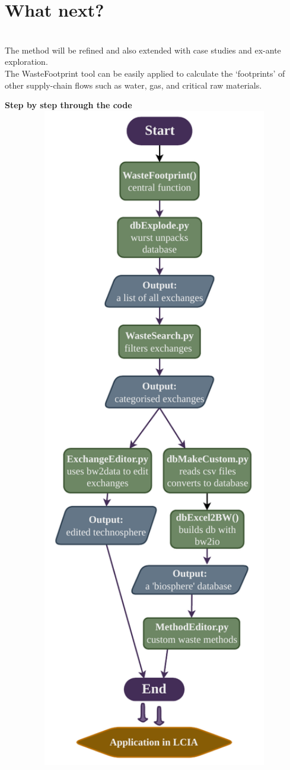 \documentclass[a0paper,fleqn]{betterposter}
\begin{document}
{    \section{What next?}\\
        The method will be refined and also extended with case studies and ex-ante exploration.\\
        The WasteFootprint tool can be easily applied to calculate the `footprints' of other supply-chain flows
        such as water, gas, and critical raw materials.

    }{
    \vspace{30pt}
    {\selectfont \textbf{Step by step through the code}}\\
    
    \includegraphics[width=1.1\textwidth]{img/Flowchart_WasteFootprint_simple.pdf}
}
\end{document}
